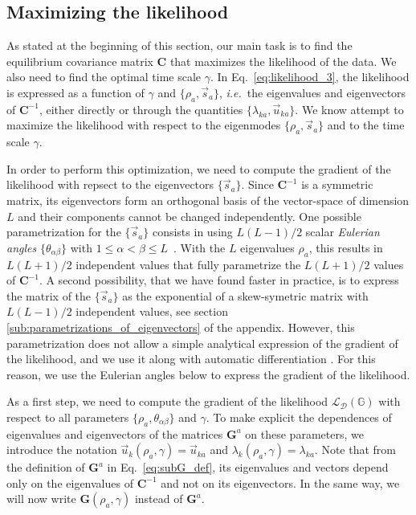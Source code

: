 \documentclass[preprint,amsmath,amssymb,superscriptaddress,showpacs,pre]{revtex4-1}
\newcommand{\ie}{\emph{i.e.}}
\newcommand{\iC}{\bm{C}^{-1}}
\newcommand{\vsa}{\vec{s}_a}
\newcommand{\vuka}{\vec{u}_{ka}}
\begin{document}

\subsection{Maximizing the likelihood} %
\label{sub:maximization_of_the_likelihood}

As stated at the beginning of this section, our main task is to find the equilibrium covariance matrix $\bm C$ that maximizes the likelihood of the data. 
We also need to find the optimal time scale $\gamma$. 
In Eq.~\eqref{eq:likelihood_3}, the likelihood is expressed as a function of $\gamma$ and $\{\rho_a, \vsa\}$, \ie~the eigenvalues and eigenvectors of $\iC$, either directly or through the quantities $\{\lambda_{ka}, \vuka \}$. 
We know attempt to maximize the likelihood with respect to the eigenmodes $\{\rho_a, \vsa\}$ and to the time scale $\gamma$. 

In order to perform this optimization, we need to compute the gradient of the likelihood with repsect to the eigenvectors $\{\vsa\}$. 
Since $\iC$ is a symmetric matrix, its eigenvectors form an orthogonal basis of the vector-space of dimension $L$ and their components cannot be changed independently.  
One possible parametrization for the $\{\vsa\}$ consists in using $L(L-1)/2$ scalar \emph{Eulerian angles} $\{\theta_{\alpha\beta}\}$ with $1\leq \alpha < \beta \leq L$~\cite{Raffenetti1970GEA, Shepard_param_OM}. 
With the $L$ eigenvalues $\rho_a$, this results in $L(L+1)/2$ independent values that fully parametrize the $L(L+1)/2$ values of $\iC$. 
A second possibility, that we have found faster in practice, is to express the matrix of the $\{\vsa\}$ as the exponential of a skew-symetric matrix with $L(L-1)/2$ independent values, see section \ref{sub:parametrizations_of_eigenvectors} of the appendix. 
However, this parametrization does not allow a simple analytical expression of the gradient of the likelihood, and we use it along with automatic differentiation \cite{Zygote.jl-2018}. 
For this reason, we use the Eulerian angles below to express the gradient of the likelihood. 

As a first step, we need to compute the gradient of the likelihood $\mathcal{L}_{\mathcal{D}}(\mathbb{G})$ with respect to all parameters $\{\rho_a, \theta_{\alpha\beta}\}$ and $\gamma$. 
To make explicit the dependences of eigenvalues and eigenvectors of the matrices $\bm G^a$ on these parameters, we introduce the notation $\vec{u}_k(\rho_a,\gamma) = \vuka$ and $\lambda_k(\rho_a,\gamma) = \lambda_{ka}$. 
Note that from the definition of $\bm G^a$ in Eq.~\eqref{eq:subG_def}, its eigenvalues and vectors depend only on the eigenvalues of $\iC$ and not on its eigenvectors. 
In the same way, we will now write $\bm G(\rho_a,\gamma)$ instead of $\bm G^a$. 
\end{document}
